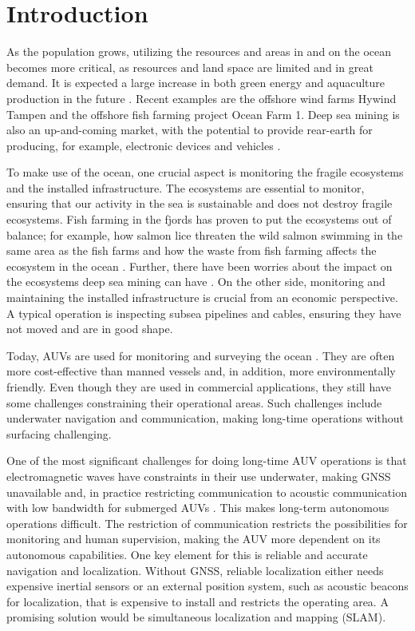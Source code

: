 \chapter{Introduction}

As the population grows, utilizing the resources and areas in and on the ocean becomes more critical, as resources and land space are limited and in great demand. It is expected a large increase in both green energy and aquaculture production in the future \cite{Oceans2050}. Recent examples are the offshore wind farms Hywind Tampen \cite{HywindEquinor} and the offshore fish farming project Ocean Farm 1\cite{HavbasertASA}. Deep sea mining is also an up-and-coming market, with the potential to provide rear-earth for producing, for example, electronic devices and vehicles \cite{Bogue2015UnderwaterApplications}.

To make use of the ocean, one crucial aspect is monitoring the fragile ecosystems and the installed infrastructure. The ecosystems are essential to monitor, ensuring that our activity in the sea is sustainable and does not destroy fragile ecosystems. Fish farming in the fjords has proven to put the ecosystems out of balance; for example, how salmon lice threaten the wild salmon swimming in the same area as the fish farms and how the waste from fish farming affects the ecosystem in the ocean \cite{Fiskeoppdrett}. Further, there have been worries about the impact on the ecosystems deep sea mining can have \cite{UnderstandingTechnology}. On the other side, monitoring and maintaining the installed infrastructure is crucial from an economic perspective. A typical operation is inspecting subsea pipelines and cables, ensuring they have not moved and are in good shape. 

Today, AUVs are used for monitoring and surveying the ocean \cite{Nicholson2008TheTechnologies}. They are often more cost-effective than manned vessels and, in addition, more environmentally friendly. Even though they are used in commercial applications, they still have some challenges constraining their operational areas. Such challenges include underwater navigation and communication, making long-time operations without surfacing challenging. 

One of the most significant challenges for doing long-time AUV operations is that electromagnetic waves have constraints in their use underwater, making GNSS unavailable and, in practice restricting communication to acoustic communication with low bandwidth for submerged AUVs \cite{Nicholson2008TheTechnologies}. This makes long-term autonomous operations difficult. The restriction of communication restricts the possibilities for monitoring and human supervision, making the AUV more dependent on its autonomous capabilities. One key element for this is reliable and accurate navigation and localization. Without GNSS, reliable localization either needs expensive inertial sensors or an external position system, such as acoustic beacons for localization, that is expensive to install and restricts the operating area. A promising solution would be simultaneous localization and mapping (SLAM).

